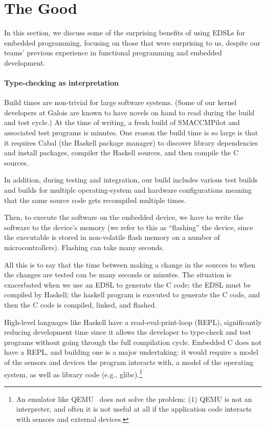 \section{The Good}

In this section, we discuss some of the surprising benefits of using EDSLs for
embedded programming, focusing on those that were surprising to us, despite our
teams' previous experience in functional programming and embedded development.

\paragraph{Type-checking as interpretation}
Build times are non-trivial for large software systems.  (Some of our kernel
developers at Galois are known to have novels on hand to read during the build
and test cycle.)  At the time of writing, a fresh build of SMACCMPilot and
associated test programs is  minutes.  One reason the build time is so
large is that it requires Cabal (the Haskell package manager) to discover
library dependencies and install packages, compiler the Haskell sources, and
then compile the C sources.

In addition, during testing
and integration, our build includes various test builds and builds for multiple
operating-system and hardware configurations meaning that the same source code
gets recompiled multiple times.

Then, to execute the software on the embedded device, we have to write the
software to the device's memory (we refer to this as ``flashing'' the device,
since the executable is stored in non-volatile flash memory on a number of
microcontrollers).  Flashing can take many seconds.

All this is to say that the time between making a change in the sources to when
the changes are tested can be many seconds or minutes.  The situation is
exacerbated when we use an EDSL to generate the C code; the EDSL must be
compiled by Haskell; the haskell program is executed to generate the C code, and
then the C code is compiled, linked, and flashed.

High-level languages like Haskell have a read-eval-print-loop (REPL),
significantly reducing development time since it allows the developer to
type-check and test programs without going through the full compilation cycle.
Embedded C does not have a REPL, and building one is a major undertaking: it
would require a model of the sensors and devices the program interacts with, a
model of the operating system, as well as library code (e.g.,
glibc).\footnote{An emulator like QEMU~\cite{} does not solve the problem: (1)
  QEMU is not an interpreter, and often it is not useful at all if the
  application code interacts with sensors and external devices.}



